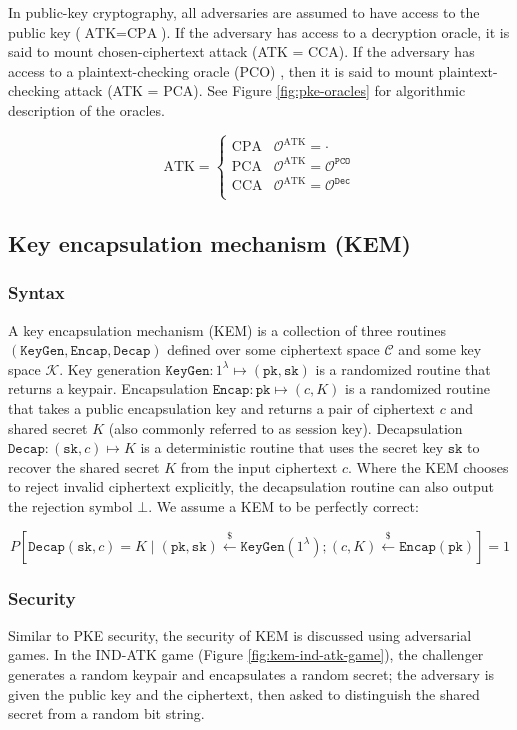 \documentclass[runningheads]{llncs}
\newcommand{\keygen}{\texttt{KeyGen}}
\newcommand{\decrypt}{\texttt{Dec}}
\newcommand{\encap}{\texttt{Encap}}
\newcommand{\decap}{\texttt{Decap}}
\newcommand{\pk}{\texttt{pk}}
\newcommand{\sk}{\texttt{sk}}
\newcommand{\pco}{\texttt{PCO}}
\newcommand{\leftsample}{\stackrel{\$}{\leftarrow}}
\begin{document}
In public-key cryptography, all adversaries are assumed to have access to the public key ($\text{ATK} = \text{CPA}$). If the adversary has access to a decryption oracle, it is said to mount chosen-ciphertext attack (ATK = CCA). If the adversary has access to a plaintext-checking oracle (PCO) , then it is said to mount plaintext-checking attack (ATK = PCA). See Figure \ref{fig:pke-oracles} for algorithmic description of the oracles.

\begin{equation*}
    \text{ATK} = \begin{cases}
        \text{CPA} & \mathcal{O}^\text{ATK} = \cdot \\
        \text{PCA} & \mathcal{O}^\text{ATK} = \mathcal{O}^\pco \\
        \text{CCA} & \mathcal{O}^\text{ATK} = \mathcal{O}^\decrypt \\
    \end{cases}
\end{equation*}

\subsection{Key encapsulation mechanism (KEM)}\label{sec:key-encapsulation-mechanism}
\subsubsection{Syntax} A key encapsulation mechanism (KEM) is a collection of three routines $(\keygen, \encap, \decap)$ defined over some ciphertext space $\mathcal{C}$ and some key space $\mathcal{K}$. Key generation $\keygen: 1^\lambda \mapsto (\pk, \sk)$ is a randomized routine that returns a keypair. Encapsulation $\encap: \pk \mapsto (c, K)$ is a randomized routine that takes a public encapsulation key and returns a pair of ciphertext $c$ and shared secret $K$ (also commonly referred to as session key). Decapsulation $\decap: (\sk, c) \mapsto K$ is a deterministic routine that uses the secret key $\sk$ to recover the shared secret $K$ from the input ciphertext $c$. Where the KEM chooses to reject invalid ciphertext explicitly, the decapsulation routine can also output the rejection symbol $\bot$. We assume a KEM to be perfectly correct:

$$
P\left[
    \decap(\sk, c) = K \mid (\pk, \sk) \leftsample \keygen(1^\lambda); (c, K) \leftsample \encap(\pk)
\right] = 1
$$

\subsubsection{Security} Similar to PKE security, the security of KEM is discussed using adversarial games. In the IND-ATK game (Figure \ref{fig:kem-ind-atk-game}), the challenger generates a random keypair and encapsulates a random secret; the adversary is given the public key and the ciphertext, then asked to distinguish the shared secret from a random bit string.
\end{document}
